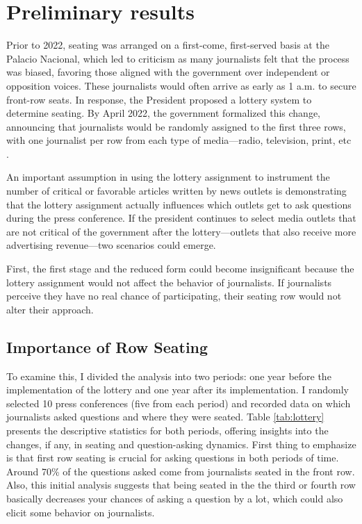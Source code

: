 \section{Preliminary results}

\label{sec:results}

Prior to 2022, seating was arranged on a first-come, first-served basis at the Palacio Nacional, which led to criticism as many journalists felt that the process was biased, favoring those aligned with the government over independent or opposition voices\citep{Tombola-Razon}. These journalists would often arrive as early as 1 a.m. to secure front-row seats. In response, the President proposed a lottery system to determine seating. By April 2022, the government formalized this change, announcing that journalists would be randomly assigned to the first three rows, with one journalist per row from each type of media—radio, television, print, etc \citep{Tombola-Financiero}. 

An important assumption in using the lottery assignment to instrument the number of critical or favorable articles written by news outlets is demonstrating that the lottery assignment actually influences which outlets get to ask questions during the press conference. If the president continues to select media outlets that are not critical of the government after the lottery—outlets that also receive more advertising revenue—two scenarios could emerge.

First, the first stage and the reduced form could become insignificant because the lottery assignment would not affect the behavior of journalists. If journalists perceive they have no real chance of participating, their seating row would not alter their approach.


\subsection{Importance of Row Seating}

To examine this, I divided the analysis into two periods: one year before the implementation of the lottery and one year after its implementation. I randomly selected 10 press conferences (five from each period) and recorded data on which journalists asked questions and where they were seated. Table \ref{tab:lottery} presents the descriptive statistics for both periods, offering insights into the changes, if any, in seating and question-asking dynamics. First thing to emphasize is that first row seating is crucial for asking questions in both periods of time. Around 70\% of the questions asked come from journalists seated in the front row. Also, this initial analysis suggests that being seated in the the third or fourth row basically decreases your chances of asking a question by a lot, which could also elicit some behavior on journalists.

